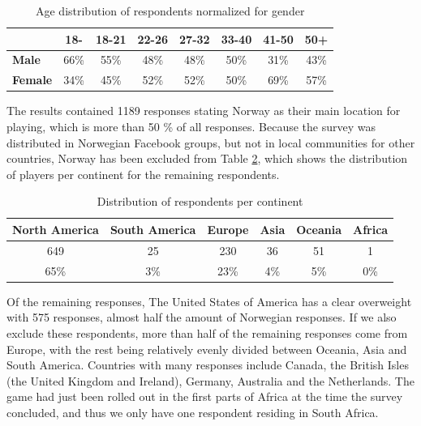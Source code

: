 \begin{table}[h]
	\centering
	\caption{Age distribution of respondents normalized for gender}
	\label{tbl:survey-age-distribution-normalized}
	\begin{tabular}{|l||c|c|c|c|c|c|c|}
		\hline
		&\textbf{18-} & \textbf{18-21} & \textbf{22-26} & \textbf{27-32} & \textbf{33-40} & \textbf{41-50} & \textbf{50+}\\
		\hline\hline
		\textbf{Male} & 66\% & 55\% & 48\% & 48\% & 50\% & 31\% & 43\% \\
		\hline
		\textbf{Female} & 34\% & 45\% & 52\% & 52\% & 50\% & 69\% & 57\% \\
		\hline
	\end{tabular}
\end{table}

The results contained 1189 responses stating Norway as their main location for playing, which is more than 50 \% of all responses. Because the survey was distributed in Norwegian Facebook groups, but not in local communities for other countries, Norway has been excluded from Table \ref{tbl:demographics-continents}, which shows the distribution of players per continent for the remaining respondents.

\begin{table}[h]
	\centering
	\caption{Distribution of respondents per continent}
	\label{tbl:demographics-continents}
	\begin{tabular}{|c|c|c|c|c|c|}
		\hline
		\textbf{North America} & \textbf{South America} & \textbf{Europe} & \textbf{Asia} & \textbf{Oceania} & \textbf{Africa}\\
		\hline\hline
		649		& 25	& 230	& 36	& 51	& 1\\
		65\%	& 3\%	& 23\%	& 4\%	& 5\%	& 0\%\\\hline
	\end{tabular}
\end{table}

Of the remaining responses, The United States of America has a clear overweight with 575 responses, almost half the amount of Norwegian responses. If we also exclude these respondents, more than half of the remaining responses come from Europe, with the rest being relatively evenly divided between Oceania, Asia and South America. Countries with many responses include Canada, the British Isles (the United Kingdom and Ireland), Germany, Australia and the Netherlands. The game had just been rolled out in the first parts of Africa at the time the survey concluded, and thus we only have one respondent residing in South Africa.

